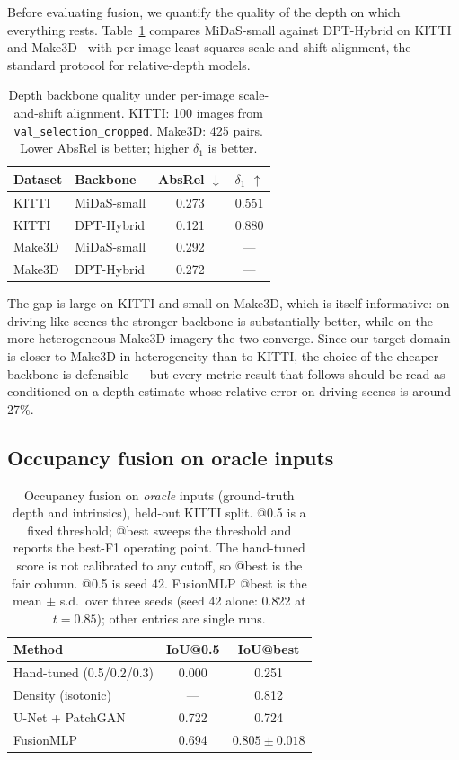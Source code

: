 \documentclass[sigconf]{acmart}
\newcommand{\rev}[1]{{\color{revcolor}#1}}
\begin{document}
Before evaluating fusion, we quantify the quality of the depth on which everything rests. Table~\ref{tab:depth} compares MiDaS-small against DPT-Hybrid on KITTI and Make3D~\cite{saxena2009make3d} with per-image least-squares scale-and-shift alignment, the standard protocol for relative-depth models.

\begin{table}[t]
\caption{Depth backbone quality under per-image scale-and-shift alignment. KITTI: 100 images from \texttt{val\_\allowbreak selection\_\allowbreak cropped}. Make3D: 425 pairs. Lower AbsRel is better; higher $\delta_1$ is better.}
\label{tab:depth}
\begin{tabular}{llcc}
\toprule
Dataset & Backbone & AbsRel $\downarrow$ & $\delta_1$ $\uparrow$ \\
\midrule
KITTI & MiDaS-small & 0.273 & 0.551 \\
KITTI & DPT-Hybrid & 0.121 & 0.880 \\
Make3D & MiDaS-small & 0.292 & --- \\
Make3D & DPT-Hybrid & 0.272 & --- \\
\bottomrule
\end{tabular}
\end{table}

The gap is large on KITTI and small on Make3D, which is itself informative: on driving-like scenes the stronger backbone is substantially better, while on the more heterogeneous Make3D imagery the two converge. Since our target domain is closer to Make3D in heterogeneity than to KITTI, the choice of the cheaper backbone is defensible --- but every metric result that follows should be read as conditioned on a depth estimate whose relative error on driving scenes is around 27\%.

\subsection{Occupancy fusion on oracle inputs}\label{sec:oracle}

\begin{table}[t]
\caption{\rev{Occupancy fusion on \emph{oracle} inputs (ground-truth depth and intrinsics), held-out KITTI split.} @0.5 is a fixed threshold; @best sweeps the threshold and reports the best-F1 operating point. The hand-tuned score is not calibrated to any cutoff, so @best is the fair column. \rev{@0.5 is seed 42. FusionMLP @best is the mean $\pm$ s.d.\ over three seeds (seed 42 alone: 0.822 at $t{=}0.85$); other entries are single runs.}}
\label{tab:oracle}
\begin{tabular}{lcc}
\toprule
Method & IoU@0.5 & IoU@best \\
\midrule
Hand-tuned (0.5/0.2/0.3) & 0.000 & 0.251 \\
\rev{Density (isotonic)} & \rev{---} & \rev{0.812} \\
U-Net + PatchGAN & 0.722 & \rev{0.724} \\
FusionMLP & 0.694 & \rev{$0.805 \pm 0.018$} \\
\bottomrule
\end{tabular}
\end{table}
\end{document}
